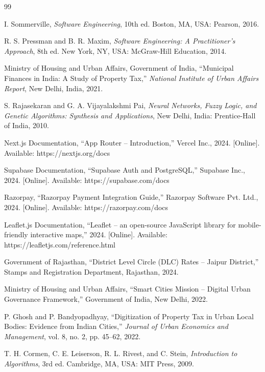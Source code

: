 \begin{thebibliography}{99}

I. Sommerville,
\textit{Software Engineering},
10th ed. Boston, MA, USA: Pearson, 2016.

R. S. Pressman and B. R. Maxim,
\textit{Software Engineering: A Practitioner's Approach},
8th ed. New York, NY, USA: McGraw-Hill Education, 2014.

Ministry of Housing and Urban Affairs, Government of India,
``Municipal Finances in India: A Study of Property Tax,''
\textit{National Institute of Urban Affairs Report},
New Delhi, India, 2021.

S. Rajasekaran and G. A. Vijayalakshmi Pai,
\textit{Neural Networks, Fuzzy Logic, and Genetic Algorithms: Synthesis and Applications},
New Delhi, India: Prentice-Hall of India, 2010.

Next.js Documentation,
``App Router -- Introduction,''
Vercel Inc., 2024. [Online].
Available: https://nextjs.org/docs

Supabase Documentation,
``Supabase Auth and PostgreSQL,''
Supabase Inc., 2024. [Online].
Available: https://supabase.com/docs

Razorpay,
``Razorpay Payment Integration Guide,''
Razorpay Software Pvt. Ltd., 2024. [Online].
Available: https://razorpay.com/docs

Leaflet.js Documentation,
``Leaflet -- an open-source JavaScript library for mobile-friendly interactive maps,''
2024. [Online].
Available: https://leafletjs.com/reference.html

Government of Rajasthan,
``District Level Circle (DLC) Rates -- Jaipur District,''
Stamps and Registration Department, Rajasthan, 2024.

Ministry of Housing and Urban Affairs,
``Smart Cities Mission -- Digital Urban Governance Framework,''
Government of India, New Delhi, 2022.

P. Ghosh and P. Bandyopadhyay,
``Digitization of Property Tax in Urban Local Bodies: Evidence from Indian Cities,''
\textit{Journal of Urban Economics and Management},
vol. 8, no. 2, pp. 45--62, 2022.

T. H. Cormen, C. E. Leiserson, R. L. Rivest, and C. Stein,
\textit{Introduction to Algorithms},
3rd ed. Cambridge, MA, USA: MIT Press, 2009.

\end{thebibliography}
